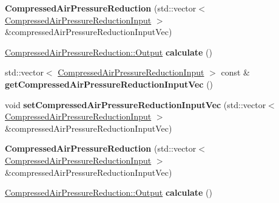 \begin{DoxyCompactItemize}
\item 
\mbox{\label{class_compressed_air_pressure_reduction_abb54045686aad41a011d84d9e0c86235}} 
{\bfseries Compressed\+Air\+Pressure\+Reduction} (std\+::vector$<$ \hyperlink{class_compressed_air_pressure_reduction_input}{Compressed\+Air\+Pressure\+Reduction\+Input} $>$ \&compressed\+Air\+Pressure\+Reduction\+Input\+Vec)
\item 
\mbox{\label{class_compressed_air_pressure_reduction_aa199484ec7a89eb123e359f3852b62be}} 
\hyperlink{struct_compressed_air_pressure_reduction_1_1_output}{Compressed\+Air\+Pressure\+Reduction\+::\+Output} {\bfseries calculate} ()
\item 
\mbox{\label{class_compressed_air_pressure_reduction_a5d560714f1159e64a091c91038d1bd1a}} 
std\+::vector$<$ \hyperlink{class_compressed_air_pressure_reduction_input}{Compressed\+Air\+Pressure\+Reduction\+Input} $>$ const  \& {\bfseries get\+Compressed\+Air\+Pressure\+Reduction\+Input\+Vec} ()
\item 
\mbox{\label{class_compressed_air_pressure_reduction_a720f44519444d8c2e48845ee84a1f069}} 
void {\bfseries set\+Compressed\+Air\+Pressure\+Reduction\+Input\+Vec} (std\+::vector$<$ \hyperlink{class_compressed_air_pressure_reduction_input}{Compressed\+Air\+Pressure\+Reduction\+Input} $>$ \&compressed\+Air\+Pressure\+Reduction\+Input\+Vec)
\item 
\mbox{\label{class_compressed_air_pressure_reduction_abb54045686aad41a011d84d9e0c86235}} 
{\bfseries Compressed\+Air\+Pressure\+Reduction} (std\+::vector$<$ \hyperlink{class_compressed_air_pressure_reduction_input}{Compressed\+Air\+Pressure\+Reduction\+Input} $>$ \&compressed\+Air\+Pressure\+Reduction\+Input\+Vec)
\item 
\mbox{\label{class_compressed_air_pressure_reduction_aa199484ec7a89eb123e359f3852b62be}} 
\hyperlink{struct_compressed_air_pressure_reduction_1_1_output}{Compressed\+Air\+Pressure\+Reduction\+::\+Output} {\bfseries calculate} ()
\item 

\end{DoxyCompactItemize}
